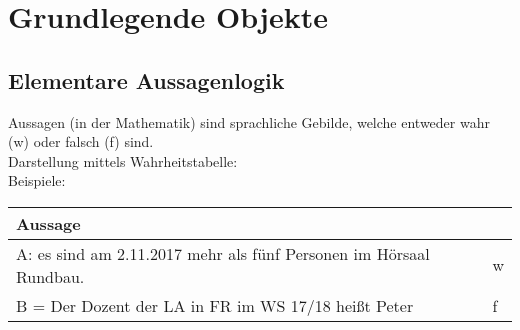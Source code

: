\documentclass{report}
\theoremstyle{customrem}
\theoremstyle{customdef}
\begin{document}
\chapter{Grundlegende Objekte}

\section{Elementare Aussagenlogik}
Aussagen (in der Mathematik) sind sprachliche Gebilde, welche entweder wahr (w) oder falsch (f) sind.\\
Darstellung mittels Wahrheitstabelle:\\
Beispiele:
\begin{tabular}{l | l}
Aussage\\
\hline
A: es sind am 2.11.2017 mehr als fünf Personen im Hörsaal Rundbau. & w\\
\hline
B = Der Dozent der LA in FR im WS 17/18 hei\ss{}t Peter & f
\end{tabular}
\end{document}
